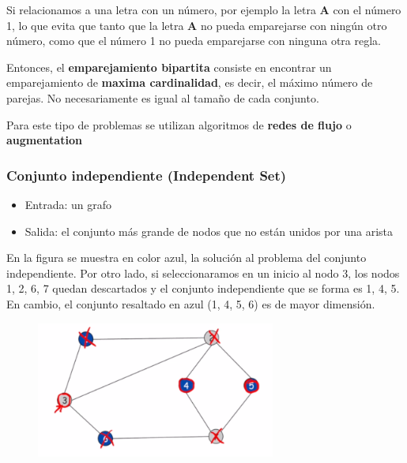 \documentclass[letterpaper]{article}
\begin{document}
Si relacionamos a una letra con un número, por ejemplo la letra \textbf{A} con el
número 1, lo que evita que tanto que la letra \textbf{A} no pueda emparejarse con
ningún otro número, como que el número 1 no pueda emparejarse con ninguna otra
regla.

Entonces, el \textbf{emparejamiento bipartita} consiste en encontrar un emparejamiento
de \textbf{maxima cardinalidad}, es decir, el máximo número de parejas. No
necesariamente es igual al tamaño de cada conjunto.

Para este tipo de problemas se utilizan algoritmos de \textbf{redes de flujo} o
\textbf{augmentation}
\subsubsection{Conjunto independiente (Independent Set)}
\label{sec:org81bd3ab}
\begin{itemize}
\item Entrada: un grafo
\item Salida: el conjunto más grande de nodos que no están unidos por una arista
\end{itemize}

En la figura se muestra en color azul, la solución al problema del conjunto
independiente. Por otro lado, si seleccionaramos en un inicio al nodo 3, los
nodos 1, 2, 6, 7 quedan descartados y el conjunto independiente que se forma es
1, 4, 5. En cambio, el conjunto resaltado en azul (1, 4, 5, 6) es de mayor
dimensión.

\begin{figure}
    \includegraphics[width=0.7\textwidth, height=0.4\textwidth]
        {./img/independent_set.png}
\end{figure}
\end{document}
